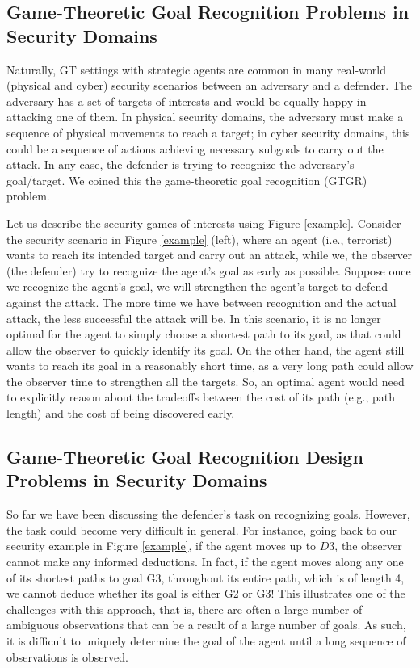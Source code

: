 \subsection{Game-Theoretic Goal Recognition Problems in Security Domains}
Naturally, GT settings with strategic agents are common in 
many real-world (physical and cyber) security scenarios between 
an adversary and a defender. 
The adversary has a set of targets of interests 
and would be equally happy in attacking one of them. 
In physical security domains, the adversary 
must make a sequence of 
physical movements to reach a target; 
in cyber security domains, this could be a sequence of 
actions achieving necessary subgoals to carry out the attack. 
In any case, the defender is trying to recognize
the adversary's goal/target. 
We coined this the game-theoretic goal recognition (GTGR) problem. 

Let us describe the security games of interests using Figure \ref{example}. 
Consider the security scenario in Figure \ref{example} (left),
where an agent (i.e., terrorist) wants to reach its intended target and carry out an attack, 
while we, the observer (the defender) try to recognize the agent's goal as early as possible. 
Suppose once we recognize the agent's goal, we will strengthen the agent's target to defend against the attack. 
The more time we have between recognition and the actual attack, the less successful the attack will be. 
In this scenario, it is no longer optimal for the agent to simply choose a shortest path to its goal, 
as that could allow the observer to quickly identify its goal. 
On the other hand, the agent still wants to reach its goal in a reasonably short time, 
as a very long path could allow the observer time to strengthen all the targets.
So, an optimal agent would need to explicitly reason about the tradeoffs 
between the cost of its path (e.g., path length) and the cost of being discovered early.

\subsection{Game-Theoretic Goal Recognition Design Problems in Security Domains}
So far we have been discussing the defender's task on recognizing goals. 
However, the task could become very difficult in general. 
For instance, going back to our security example in Figure \ref{example}, 
if the agent moves up to $D3$, the observer cannot make any informed deductions. 
In fact, if the agent moves along any one of its shortest paths to goal G3, 
throughout its entire path, which is of length 4, we cannot deduce whether its goal is either G2 or G3! 
This illustrates one of the challenges with this approach, that is, there are often a large number of 
ambiguous observations that can be a result of a large number of goals. 
As such, it is difficult to uniquely determine the goal of the agent until a long sequence of observations is observed.

